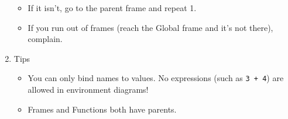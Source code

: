 \begin{blocksection}
\begin{enumerate}
\begin{itemize}
			\item If it isn't, go to the parent frame and repeat 1.
			\item If you run out of frames (reach the Global frame and it's not there), complain.
    		\end{itemize}
    	\item Tips
    		\begin{itemize}
			\item You can only bind names to values. No expressions (such as \texttt{3 + 4}) are allowed in environment diagrams!
			\item Frames and Functions both have parents.
		\end{itemize}
\end{enumerate}
\end{blocksection}
